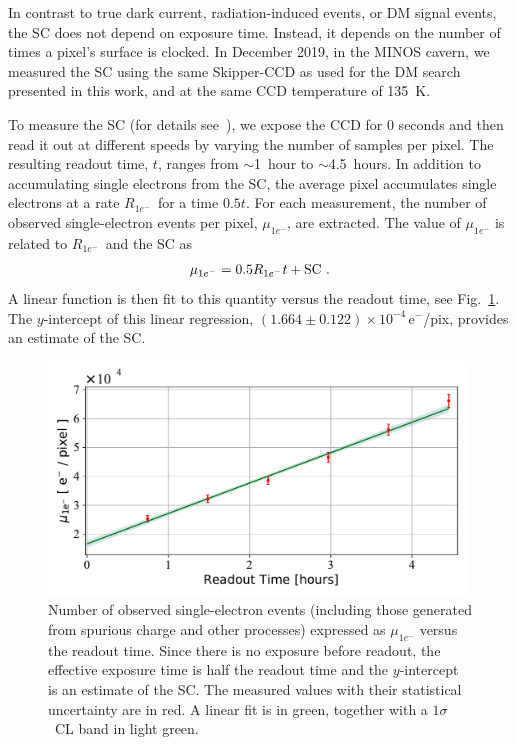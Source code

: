 \documentclass[aps,prl,twocolumn,showpacs,superscriptaddress,preprintnumbers]{revtex4-1}
\newcommand{\unit}[1]{\ensuremath{\mathrm{\,#1}}\xspace}
\newcommand{\e}{\unit{e^{-}}}
\newcommand{\Rs}{$R_{1e^-}$}
\begin{document}
In contrast to true dark current, radiation-induced events, or DM signal events, the SC does not depend on exposure time.  
Instead, it depends on the number of times a pixel's surface is clocked. 
In December 2019, in the MINOS cavern, we measured the SC using the same Skipper-CCD as used for the DM search presented in this work, and at the same CCD temperature of 135~K.  

To measure the SC (for details see~\cite{Spurious-charge}), we expose the CCD for 0 seconds and then read it out at different speeds by varying the number of samples per pixel. The resulting readout time, $t$, ranges from $\sim$1~hour to $\sim$4.5~hours.  In addition to accumulating single electrons from the SC, the average pixel accumulates single electrons at a rate \Rs\ for a time $0.5t$. For each measurement, the number of observed single-electron events per pixel, $\mu_{1e^{-}}$, are extracted.  The value of $\mu_{1e^{-}}$ is related to \Rs\ and the SC as
\begin{equation}
    \mu_{1e^{-}} = 0.5 R_{1e^-} t + {\rm SC}\ .
\end{equation}
A linear function is then fit to this quantity versus the readout time, see Fig.~\ref{fig:SC}. The $y$-intercept of this linear regression, $(1.664 \pm 0.122)\times 10^{-4}$\e/pix, provides an estimate of the SC.

\begin{figure}[t!]
\begin{center}
\includegraphics[width=0.99\textwidth]{SC.pdf}
\caption{Number of observed single-electron events (including those generated from spurious charge and other processes) expressed as $\mu_{1e^{-}}$ versus the readout time.  Since there is no exposure before readout, the effective exposure time is half the readout time and the $y$-intercept is an estimate of the SC.  The measured values with their statistical uncertainty are in red. A linear fit is in green, together with a $1\sigma$~CL band in light green.  
\vspace{-3mm}
}
\label{fig:SC}
\end{center}
\end{figure}
\end{document}
